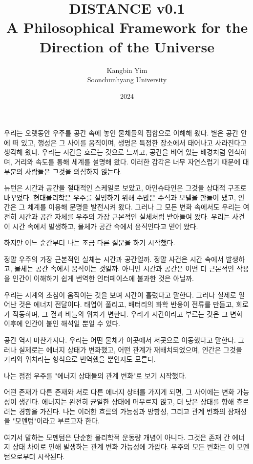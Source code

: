 \documentclass[12pt]{article}
\title{DISTANCE v0.1 \\[0.5em]
\large A Philosophical Framework for the Direction of the Universe \\
}
\author{Kangbin Yim\\Soonchunhyang University}
\date{2024}
\begin{document}
\maketitle

우리는 오랫동안 우주를 공간 속에 놓인 물체들의 집합으로 이해해 왔다. 별은 공간 안에 떠 있고, 행성은 그 사이를 움직이며, 생명은 특정한 장소에서 태어나고 사라진다고 생각해 왔다. 우리는 시간을 흐르는 것으로 느끼고, 공간을 비어 있는 배경처럼 인식하며, 거리와 속도를 통해 세계를 설명해 왔다. 이러한 감각은 너무 자연스럽기 때문에 대부분의 사람들은 그것을 의심하지 않는다.

뉴턴은 시간과 공간을 절대적인 스케일로 보았고, 아인슈타인은 그것을 상대적 구조로 바꾸었다. 현대물리학은 우주를 설명하기 위해 수많은 수식과 모델을 만들어 냈고, 인간은 그 체계를 이용해 문명을 발전시켜 왔다. 그러나 그 모든 변화 속에서도 우리는 여전히 시간과 공간 자체를 우주의 가장 근본적인 실체처럼 받아들여 왔다. 우리는 사건이 시간 속에서 발생하고, 물체가 공간 속에서 움직인다고 믿어 왔다.

하지만 어느 순간부터 나는 조금 다른 질문을 하기 시작했다.

정말 우주의 가장 근본적인 실체는 시간과 공간일까.
정말 사건은 시간 속에서 발생하고, 물체는 공간 속에서 움직이는 것일까.
아니면 시간과 공간은 어떤 더 근본적인 작용을 인간이 이해하기 쉽게 번역한 인터페이스에 불과한 것은 아닐까.

우리는 시계의 초침이 움직이는 것을 보며 시간이 흘렀다고 말한다. 그러나 실제로 일어난 것은 에너지 전달이다. 태엽이 풀리고, 배터리의 화학 반응이 전류를 만들고, 회로가 작동하며, 그 결과 바늘의 위치가 변한다. 우리가 시간이라고 부르는 것은 그 변화 이후에 인간이 붙인 해석일 뿐일 수 있다.

공간 역시 마찬가지다. 우리는 어떤 물체가 이곳에서 저곳으로 이동했다고 말한다. 그러나 실제로는 에너지 상태가 변화했고, 어떤 관계가 재배치되었으며, 인간은 그것을 거리와 위치라는 형식으로 번역했을 뿐인지도 모른다.

나는 점점 우주를 "에너지 상태들의 관계 변화"로 보기 시작했다.

어떤 존재가 다른 존재와 서로 다른 에너지 상태를 가지게 되면, 그 사이에는 변화 가능성이 생긴다. 에너지는 완전히 균일한 상태에 머무르지 않고, 더 낮은 상태를 향해 흐르려는 경향을 가진다. 나는 이러한 흐름의 가능성과 방향성, 그리고 관계 변화의 잠재성을 "모멘텀"이라고 부르고자 한다.

여기서 말하는 모멘텀은 단순한 물리학적 운동량 개념이 아니다. 그것은 존재 간 에너지 상태 차이로 인해 발생하는 관계 변화 가능성에 가깝다. 우주의 모든 변화는 이 모멘텀으로부터 시작된다.
\end{document}
